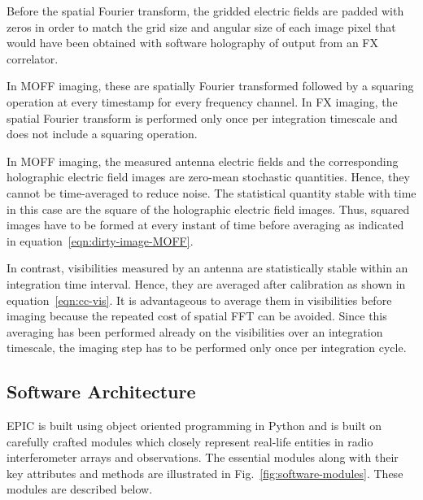 \documentclass[a4paper,fleqn,usenatbib]{../mnras}
\begin{document}
\par\medskip
{}
\par\medskip
\noindent Before the spatial Fourier transform, the gridded electric fields are 
padded with zeros in order to match the grid size and angular size of each image 
pixel that would have been obtained with software holography of output from an FX
correlator. 

In MOFF imaging, these are spatially Fourier transformed followed by a squaring
operation at every timestamp for every frequency channel. In FX imaging, the
spatial Fourier transform is performed only once per integration timescale and
does not include a squaring operation.

\par\medskip
{}
\par\medskip
\noindent In MOFF imaging, the measured antenna electric fields and the 
corresponding holographic electric field images are zero-mean stochastic 
quantities. Hence, they cannot be time-averaged to reduce noise. The statistical 
quantity stable with time in this case are the square of the holographic 
electric field images. Thus, squared images have to be formed at every instant 
of time before averaging as indicated in equation~\ref{eqn:dirty-image-MOFF}.

In contrast, visibilities measured by an antenna are statistically stable within
an integration time interval. Hence, they are averaged after calibration as shown
in equation~\ref{eqn:cc-vis}. It is advantageous to average them in visibilities
before imaging because the repeated cost of spatial FFT can be avoided. Since 
this averaging has been performed already on the visibilities over an integration 
timescale, the imaging step has to be performed only once per integration cycle. 

\subsection{Software Architecture}\label{sec:software-modules}

EPIC is built using object oriented programming in Python and is built on
carefully crafted modules which closely represent real-life entities in radio 
interferometer arrays and observations. The essential modules along with their
key attributes and methods are illustrated in Fig.~\ref{fig:software-modules}.
These modules are described below.
\end{document}
